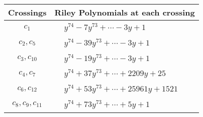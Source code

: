 \documentclass[1p]{elsarticle_modified}
\theoremstyle{definition}
\begin{document}
\begin{tabular}{m{50pt}|m{274pt}}
Crossings & \hspace{64pt}Riley Polynomials at each crossing \\
\hline $$\begin{aligned}c_{1}\end{aligned}$$&$\begin{aligned}
&y^{74}-7 y^{73}+\cdots-3 y+1
\end{aligned}$\\
\hline $$\begin{aligned}c_{2},c_{5}\end{aligned}$$&$\begin{aligned}
&y^{74}-39 y^{73}+\cdots-3 y+1
\end{aligned}$\\
\hline $$\begin{aligned}c_{3},c_{10}\end{aligned}$$&$\begin{aligned}
&y^{74}-19 y^{73}+\cdots-3 y+1
\end{aligned}$\\
\hline $$\begin{aligned}c_{4},c_{7}\end{aligned}$$&$\begin{aligned}
&y^{74}+37 y^{73}+\cdots+2209 y+25
\end{aligned}$\\
\hline $$\begin{aligned}c_{6},c_{12}\end{aligned}$$&$\begin{aligned}
&y^{74}+53 y^{73}+\cdots+25961 y+1521
\end{aligned}$\\
\hline $$\begin{aligned}c_{8},c_{9},c_{11}\end{aligned}$$&$\begin{aligned}
&y^{74}+73 y^{73}+\cdots+5 y+1
\end{aligned}$\\
\hline
\end{tabular}
\vskip 2pc
\end{document}
